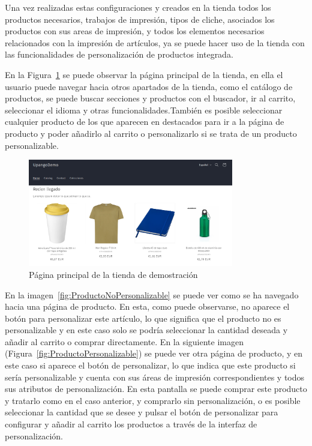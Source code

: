 \documentclass[11pt]{article}
\begin{document}
Una vez realizadas estas configuraciones y creados en la tienda todos los productos necesarios, trabajos de impresión, tipos de cliche, asociados los productos con sus areas de impresión, y todos los elementos necesarios relacionados con
la impresión de artículos, ya se puede hacer uso de la tienda con las funcionalidades de personalización de productos integrada.

En la Figura~\ref{fig:HomeTiendaDemo} se puede observar la página principal de la tienda, en ella el usuario puede navegar hacia otros apartados de la tienda, como el catálogo de productos, se puede buscar secciones y productos con el buscador, ir al carrito, seleccionar el idioma y otras funcionalidades.También
es posible seleccionar cualquier producto de los que aparecen en destacados para ir a la página de producto y poder añadirlo al carrito o personalizarlo si se trata de un producto
personalizable.

\begin{figure}[H]
    \centering
    \includegraphics[width=0.8\textwidth]{imagenes/ManualUsuario/HomeTiendaDemo.png}
    \caption{\label{fig:HomeTiendaDemo}Página principal de la tienda de demostración}
    \vspace{\fill}
\end{figure}

En la imagen~\ref{fig:ProductoNoPersonalizable} se puede ver como se ha navegado hacia una página de producto. En esta, como puede observarse, no aparece el botón para personalizar este
artículo, lo que significa que el producto no es personalizable y en este caso solo se podría seleccionar la cantidad deseada y añadir al carrito o comprar directamente.
En la siguiente imagen (Figura~\ref{fig:ProductoPersonalizable}) se puede ver otra página de producto, y en este caso si aparece el botón de personalizar, lo que indica que este producto
si sería personalizable y cuenta con sus áreas de impresión correspondientes y todos sus atributos de personalización. En esta pantalla se puede comprar este producto y tratarlo como en el caso anterior,
y comprarlo sin personalización, o es posible seleccionar la cantidad que se desee y pulsar el botón de personalizar para configurar y añadir al carrito los productos a través de la interfaz de personalización.
\end{document}
